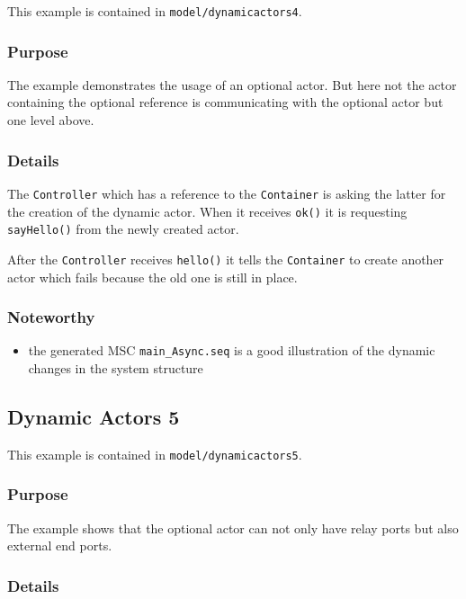 This example is contained in \texttt{model/dynamicactors4}.

\subsubsection{Purpose}

The example demonstrates the usage of an optional actor. But here not the actor containing the optional reference
is communicating with the optional actor but one level above.

\subsubsection{Details}

The \texttt{Controller} which has a reference to the \texttt{Container} is asking the latter
for the creation of the dynamic actor. When it receives \texttt{ok()} it is requesting \texttt{sayHello()}
from the newly created actor.

After the \texttt{Controller} receives \texttt{hello()} it tells the \texttt{Container} to create another
actor which fails because the old one is still in place.

\subsubsection{Noteworthy}

\begin{itemize}
\item the generated MSC \texttt{main\_Async.seq} is a good illustration of the dynamic changes in the system structure
\end{itemize}

\subsection{Dynamic Actors 5}

This example is contained in \texttt{model/dynamicactors5}.

\subsubsection{Purpose}

The example shows that the optional actor can not only have relay ports but also external end ports.

\subsubsection{Details}

